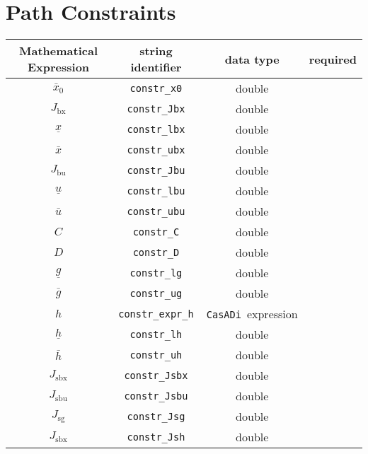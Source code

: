 \documentclass{article}
\newcommand{\code}[1]{\texttt{#1}}
\newcommand{\casadi}{\texttt{CasADi}}
\newcommand{\ind}[1]{_{\textrm{#1}}}
\begin{document}
\section{Path Constraints}
\begin{table}[h]
	\centering
	\begin{tabular}{|c|c|c|c|}
		\toprule
		Mathematical Expression & string identifier & data type & required \\ \midrule
		$ \bar{x}_0 $ & \code{constr\_x0} & double & \mandatory \\ \midrule
		$J_{\textrm{bx}}$ & \code{constr\_Jbx}    & double  & \optional  \\
		$\underline{x} $    & \code{constr\_lbx}     & double  & \optional  \\
		$\bar{x} $  & \code{constr\_ubx}     & double  & \optional   \\ \midrule
		$J_{\textrm{bu}}$ & \code{constr\_Jbu}    & double  & \optional    \\
		$\underline{u} $    & \code{constr\_lbu}     & double   & \optional   \\
		$\bar{u} $         & \code{constr\_ubu}     & double  & \optional   \\ \midrule
		$C$ & \code{constr\_C}    & double  & \optional \\
		$D $    & \code{constr\_D}     & double  & \optional \\
		$\underline{g} $    & \code{constr\_lg}     & double  & \optional    \\
		$\bar{g} $         & \code{constr\_ug}     & double  & \optional   \\ \midrule
		$ h $ & \code{constr\_expr\_h}    & \casadi~expression  & \optional   \\
		$\underline{h} $    & \code{constr\_lh}     & double   & \optional   \\
		$\bar{h} $         & \code{constr\_uh}     & double  & \optional   \\ \midrule
		$ J\ind{sbx} $ & \code{constr\_Jsbx} & double & \optional  \\
		$ J\ind{sbu} $ & \code{constr\_Jsbu} & double  & \optional \\
		$ J\ind{sg} $ & \code{constr\_Jsg} & double & \optional  \\
		$ J\ind{sbx} $ & \code{constr\_Jsh} & double  & \optional  \\
		\bottomrule
	\end{tabular}
\end{table}
\end{document}
